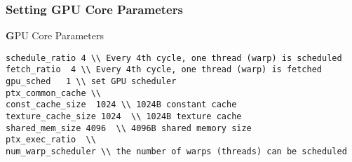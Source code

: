 \subsubsection{Setting GPU Core Parameters}
{\textbf GPU Core Parameters} 



\begin{Verbatim}
schedule_ratio 4 \\ Every 4th cycle, one thread (warp) is scheduled 
fetch_ratio  4 \\ Every 4th cycle, one thread (warp) is fetched 
gpu_sched   1 \\ set GPU scheduler 
ptx_common_cache \\ 
const_cache_size  1024 \\ 1024B constant cache  
texture_cache_size 1024  \\ 1024B texture cache
shared_mem_size 4096  \\ 4096B shared memory size 
ptx_exec_ratio  \\ 
num_warp_scheduler \\ the number of warps (threads) can be scheduled  
\end{Verbatim}
















